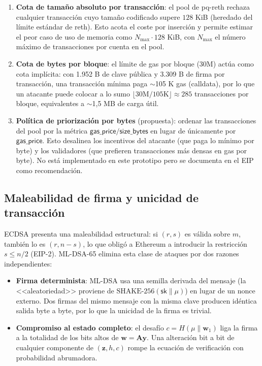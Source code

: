 \begin{enumerate}
  \item \textbf{Cota de tamaño absoluto por transacción}: el pool de pq-reth rechaza cualquier transacción cuyo tamaño codificado supere $128$ KiB (heredado del límite estándar de reth). Esto acota el coste por inserción y permite estimar el peor caso de uso de memoria como $N_{\max} \cdot 128$ KiB, con $N_{\max}$ el número máximo de transacciones por cuenta en el pool.
  
  \item \textbf{Cota de bytes por bloque}: el límite de gas por bloque (30M) actúa como cota implícita: con 1.952 B de clave pública y 3.309 B de firma por transacción, una transacción mínima paga $\sim$105 K gas (calldata), por lo que un atacante puede colocar a lo sumo $\lfloor 30\text{M} / 105\text{K} \rfloor \approx 285$ transacciones por bloque, equivalentes a $\sim$1,5 MB de carga útil.
  
  \item \textbf{Política de priorización por bytes} (propuesta): ordenar las transacciones del pool por la métrica $\textsf{gas\_price}/\textsf{size\_bytes}$ en lugar de únicamente por $\textsf{gas\_price}$. Esto desalinea los incentivos del atacante (que paga lo mínimo por byte) y los validadores (que prefieren transacciones más densas en gas por byte). No está implementado en este prototipo pero se documenta en el EIP como recomendación.
\end{enumerate}

\subsection{Maleabilidad de firma y unicidad de transacción}
\label{sec:sec_malleability}

ECDSA presenta una maleabilidad estructural: si $(r, s)$ es válida sobre $m$, también lo es $(r, n-s)$, lo que obligó a Ethereum a introducir la restricción $s \leq n/2$ (EIP-2). ML-DSA-65 elimina esta clase de ataques por dos razones independientes:

\begin{itemize}
  \item \textbf{Firma determinista}: ML-DSA usa una semilla derivada del mensaje (la <<aleatoriedad>> proviene de $\text{SHAKE-256}(\textsf{sk} \| \mu)$) en lugar de un nonce externo. Dos firmas del mismo mensaje con la misma clave producen idéntica salida byte a byte, por lo que la unicidad de la firma es trivial.
  
  \item \textbf{Compromiso al estado completo}: el desafío $c = H(\mu \| \mathbf{w}_1)$ liga la firma a la totalidad de los bits altos de $\mathbf{w} = \mathbf{A}\mathbf{y}$. Una alteración bit a bit de cualquier componente de $(\mathbf{z}, h, c)$ rompe la ecuación de verificación con probabilidad abrumadora.
\end{itemize}

